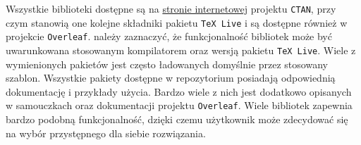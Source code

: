 Wszystkie biblioteki dostępne są na \href{https://ctan.org/}{stronie internetowej} projektu \texttt{CTAN}, przy czym stanowią one kolejne składniki pakietu \texttt{TeX Live} i są dostępne również w projekcie \texttt{Overleaf}. należy zaznaczyć, że funkcjonalność bibliotek może być uwarunkowana stosowanym kompilatorem oraz wersją pakietu \texttt{TeX Live}. Wiele z wymienionych pakietów jest często ładowanych domyślnie przez stosowany szablon. Wszystkie pakiety dostępne w repozytorium posiadają odpowiednią dokumentację i przykłady użycia. Bardzo wiele z nich jest dodatkowo opisanych w samouczkach oraz dokumentacji projektu \texttt{Overleaf}. Wiele bibliotek zapewnia bardzo podobną funkcjonalność, dzięki czemu użytkownik może zdecydować się na wybór przystępnego dla siebie rozwiązania.
